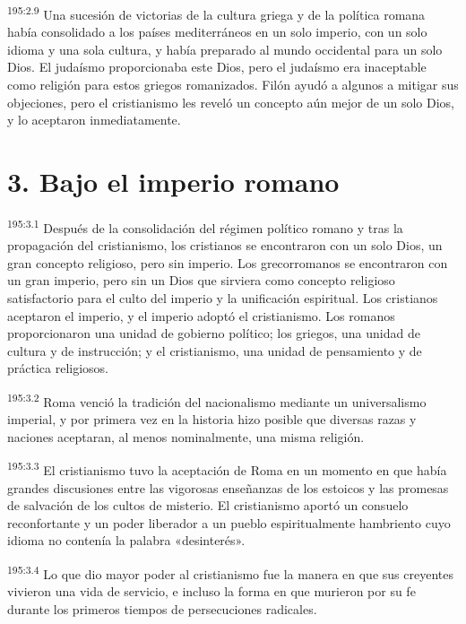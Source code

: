 \par 
\textsuperscript{195:2.9} Una sucesión de victorias de la cultura griega y de la política romana había consolidado a los países mediterráneos en un solo imperio, con un solo idioma y una sola cultura, y había preparado al mundo occidental para un solo Dios. El judaísmo proporcionaba este Dios, pero el judaísmo era inaceptable como religión para estos griegos romanizados. Filón ayudó a algunos a mitigar sus objeciones, pero el cristianismo les reveló un concepto aún mejor de un solo Dios, y lo aceptaron inmediatamente.

\section*{3. Bajo el imperio romano}
\par 
\textsuperscript{195:3.1} Después de la consolidación del régimen político romano y tras la propagación del cristianismo, los cristianos se encontraron con un solo Dios, un gran concepto religioso, pero sin imperio. Los grecorromanos se encontraron con un gran imperio, pero sin un Dios que sirviera como concepto religioso satisfactorio para el culto del imperio y la unificación espiritual. Los cristianos aceptaron el imperio, y el imperio adoptó el cristianismo. Los romanos proporcionaron una unidad de gobierno político; los griegos, una unidad de cultura y de instrucción; y el cristianismo, una unidad de pensamiento y de práctica religiosos.

\par 
\textsuperscript{195:3.2} Roma venció la tradición del nacionalismo mediante un universalismo imperial, y por primera vez en la historia hizo posible que diversas razas y naciones aceptaran, al menos nominalmente, una misma religión.

\par 
\textsuperscript{195:3.3} El cristianismo tuvo la aceptación de Roma en un momento en que había grandes discusiones entre las vigorosas enseñanzas de los estoicos y las promesas de salvación de los cultos de misterio. El cristianismo aportó un consuelo reconfortante y un poder liberador a un pueblo espiritualmente hambriento cuyo idioma no contenía la palabra «desinterés».

\par 
\textsuperscript{195:3.4} Lo que dio mayor poder al cristianismo fue la manera en que sus creyentes vivieron una vida de servicio, e incluso la forma en que murieron por su fe durante los primeros tiempos de persecuciones radicales.

